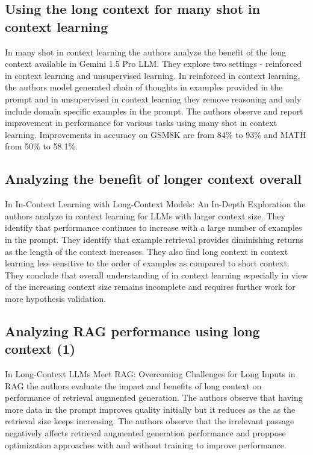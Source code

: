 \documentclass[twocolumn,11pt]{article}
\begin{document}
\subsection{Using the long context for many shot in context learning}
In many shot in context learning \cite{agarwal2024manyshotincontextlearning} the authors analyze the benefit of the long context available in Gemini 1.5 Pro LLM. They explore two settings - reinforced in context learning and unsupervised learning. In reinforced in context learning, the authors model generated chain of thoughts in examples provided in the prompt and in unsupervised in context learning they remove reasoning and only include domain specific examples in the prompt. The authors observe and report improvement in performance for various tasks using many shot in context learning. Improvements in accuracy on GSM8K \cite{cobbe2021gsm8k} are from 84\% to 93\% and MATH \cite{hendrycksmath2021} from 50\% to 58.1\%.

\subsection{Analyzing the benefit of longer context overall}
In In-Context Learning with Long-Context Models: An In-Depth
Exploration \cite{bertsch2024incontextlearninglongcontextmodels} the authors analyze in context learning for LLMs with larger context size. They identify that performance continues to increase with a large number of examples in the prompt. They identify that example retrieval provides diminishing returns as the length of the context increases. They also find long context in context learning less sensitive to the order of examples as compared to short context. They conclude that overall understanding of in context learning especially in view of the increasing context size remains incomplete and requires further work for more hypothesis validation.

\subsection{Analyzing RAG performance using long context (1)}
In Long-Context LLMs Meet RAG: Overcoming Challenges for Long Inputs in RAG \cite{jin2024longcontextllmsmeetrag} the authors evaluate the impact and benefits of long context on performance of retrieval augmented generation.  The authors observe that having more data in the prompt improves quality initially but it reduces as the as the retrieval size keeps increasing. The authors observe that the irrelevant passage negatively affects retrieval augmented generation performance and proppose optimization approaches with and without training to improve performance.
\end{document}
